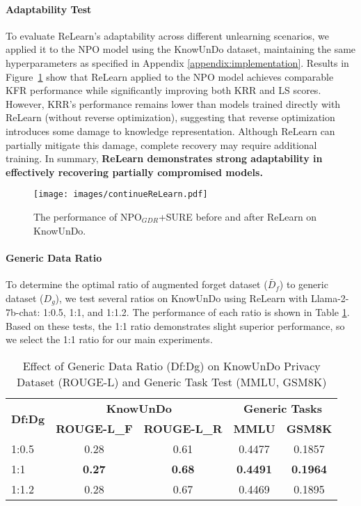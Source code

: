 \paragraph{Adaptability Test}
To evaluate ReLearn's adaptability across different unlearning scenarios, we applied it to the NPO model using the KnowUnDo dataset, maintaining the same hyperparameters as specified in Appendix \ref{appendix:implementation}.
Results in Figure~\ref{fig:relearn} show that ReLearn applied to the NPO model achieves comparable KFR performance while significantly improving both KRR and LS scores.
However, KRR's performance remains lower than models trained directly with ReLearn (without reverse optimization), suggesting that reverse optimization introduces some damage to knowledge representation.
Although ReLearn can partially mitigate this damage, complete recovery may require additional training.
In summary, \textbf{ReLearn demonstrates strong adaptability in effectively recovering partially compromised models.}
\begin{figure}[htbp]
  \centering
  \texttt{[image: images/continueReLearn.pdf]}
  \caption{The performance of NPO$_{GDR}$+SURE before and after ReLearn on KnowUnDo.}
  \label{fig:relearn}
\end{figure}
\paragraph{Generic Data Ratio}
\label{generic_data_ratio}
To determine the optimal ratio of augmented forget dataset ($\tilde{D_f}$) to generic dataset ($D_g$), we test several ratios on KnowUnDo using ReLearn with Llama-2-7b-chat: 1:0.5, 1:1, and 1:1.2. 
The performance of each ratio is shown in Table \ref{tab:generic_data_ratio}. 
Based on these tests, the 1:1 ratio demonstrates slight superior performance, so we select the 1:1 ratio for our main experiments.

\begin{table}[htbp]
\centering
\small
\renewcommand{\arraystretch}{1.2}
\setlength{\tabcolsep}{2.8pt}
\begin{tabular}{l|cc||cc}
\hline
\multirow{2}{*}{\textbf{Df:Dg}} & \multicolumn{2}{c||}{\textbf{KnowUnDo}} & \multicolumn{2}{c}{\textbf{Generic Tasks}} \\
\cline{2-5}
& \textbf{ROUGE-L\_F} & \textbf{ROUGE-L\_R} & \textbf{MMLU} & \textbf{GSM8K} \\
\hline
1:0.5 & 0.28 & 0.61 & 0.4477 & 0.1857 \\
1:1 & \textbf{0.27} & \textbf{0.68} & \textbf{0.4491} & \textbf{0.1964} \\
1:1.2 & 0.28 & 0.67 & 0.4469 & 0.1895 \\
\hline
\end{tabular}
\caption{Effect of Generic Data Ratio (Df:Dg) on KnowUnDo Privacy Dataset (ROUGE-L) and Generic Task Test (MMLU, GSM8K)}
\label{tab:generic_data_ratio}
\end{table}
